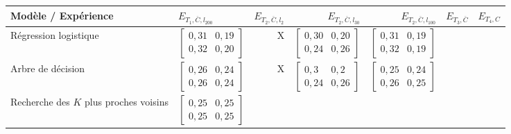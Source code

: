             \begin{landscape}
            \begin{table}[!ht]
                \begin{center}
                    \begin{tabular}{p{}|U|DDD|T|Q} \toprule
                    \textbf{Modèle / Expérience} & \textbf{$E_{T_1, \overline C, l_{200}}$} & \textbf{
                        $E_{T_2,\overline C, l_{2}}$} & \textbf{$E_{T_2,\overline C, l_{30}}$} & \textbf{$E_{T_2,\overline C, l_{100}}$}  & \textbf{$E_{T_3,\overline C}$} & \textbf{$E_{T_4, C}$} \\
                    \midrule
                    Régression logistique &
                    $\begin{bmatrix}0,31 & 0,19 \\ 0,32 & 0,20\end{bmatrix}$ &
                    X& $\begin{bmatrix}0,30 & 0,20 \\ 0,24 & 0,26\end{bmatrix}$  & $\begin{bmatrix}
                             0,31 & 0,19 \\
                             0,32 & 0,19\end{bmatrix}$ &
                    &   \\[3mm]
                    Arbre de décision & $\begin{bmatrix}
                                             0,26 & 0,24 \\
                                             0,26 & 0,24\end{bmatrix}$ & X&
                    $\begin{bmatrix}0,3 & 0,2 \\ 0,24 & 0,26\end{bmatrix}$ & $\begin{bmatrix}
                                                                 0,25 & 0,24 \\
                                                                 0,26 & 0,25\end{bmatrix}$ &  &   \\[3mm]
                    Recherche des $K$ plus proches voisins & $\begin{bmatrix}
                                                                 0,25 & 0,25 \\
                                                                 0,25 & 0,25\end{bmatrix}$ &

\end{tabular}
\end{center}
\end{table}
\end{landscape}
